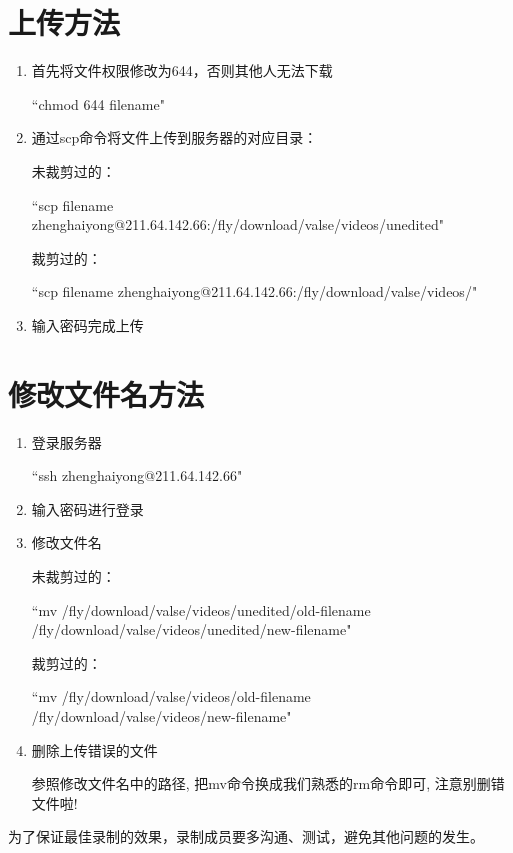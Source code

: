 \documentclass[12pt]{article}
\begin{document}
\section{上传方法}
\begin{enumerate}
 \item 首先将文件权限修改为644，否则其他人无法下载

   ``chmod 644 filename"

 \item 通过scp命令将文件上传到服务器的对应目录：

{\color{blue}未裁剪过的：}

  ``scp filename zhenghaiyong@211.64.142.66:/fly/download/valse/videos/unedited"

{\color{blue}裁剪过的：}

  ``scp filename zhenghaiyong@211.64.142.66:/fly/download/valse/videos/"

 \item 输入密码完成上传

\end{enumerate}

\section{修改文件名方法}
\begin{enumerate}
 \item 登录服务器

``ssh zhenghaiyong@211.64.142.66"

 \item 输入密码进行登录

 \item 修改文件名

{\color{blue}未裁剪过的：}

  ``mv /fly/download/valse/videos/unedited/old-filename /fly/download/valse/videos/unedited/new-filename"

{\color{blue}裁剪过的：}

  ``mv /fly/download/valse/videos/old-filename /fly/download/valse/videos/new-filename"
  
 \item 删除上传错误的文件
 
 参照修改文件名中的路径, 把mv命令换成我们熟悉的rm命令即可, 注意别删错文件啦!
\end{enumerate}





{\color{red}为了保证最佳录制的效果，录制成员要多沟通、测试，避免其他问题的发生。}
\end{document}
